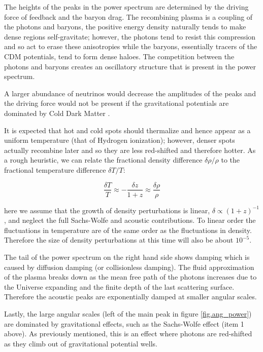The heights of the peaks in the power spectrum are determined by the driving force of feedback and the baryon drag.
The recombining plasma is a coupling of the photons and baryons, the positive energy density naturally tends to make dense regions self-gravitate; however, the photons tend to resist this compression and so act to erase these anisotropies while the baryons, essentially tracers of the CDM potentials, tend to form dense haloes. The competition between the photons and baryons creates an oscillatory structure that is present in the power spectrum.

A larger abundance of neutrinos would decrease the amplitudes of the peaks and the driving force would not be present if the gravitational potentials are dominated by Cold Dark Matter \citep{bib_huw2}.

It is expected that hot and cold spots should thermalize and hence appear as a uniform temperature (that of Hydrogen ionization); however, denser spots actually recombine later and so they are less red-shifted and therefore hotter. As a rough heuristic, we can relate the fractional density difference $\delta \rho / \rho$ to the fractional temperature difference $\delta T / T$:

\begin{equation}
\frac{\delta T}{T} \approx - \frac{\delta z}{1+ z} \approx \frac{\delta \rho}{\rho}
\end{equation}

\noindent here we assume that the growth of density perturbations is linear, $\delta \propto (1 +z)^{-1}$, and neglect the full Sachs-Wolfe and acoustic contributions. To linear order the fluctuations in temperature are of the same order as the fluctuations in density. Therefore the size of density perturbations at this time will also be about $10^{-5}$.

The tail of the power spectrum on the right hand side shows damping which is caused by diffusion damping (or collisionless damping). The fluid approximation of the plasma breaks down as the mean free path of the photons increases due to the Universe expanding and the finite depth of the last scattering surface. Therefore the acoustic peaks are exponentially damped at smaller angular scales.

Lastly, the large angular scales (left of the main peak in figure \ref{fig.ang_power}) are dominated by gravitational effects, such as the Sachs-Wolfe effect (item 1 above). As previously mentioned, this is an effect where photons are red-shifted as they climb out of gravitational potential wells.


